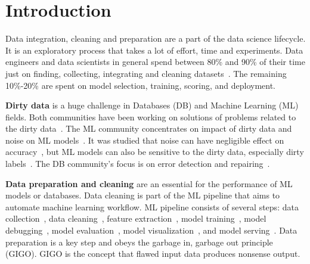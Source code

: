 \chapter{Introduction}
Data integration, cleaning and preparation are a part of the data science lifecycle. It is an exploratory process that takes a lot of effort, time and experiments.
Data engineers and data scientists in general spend between 80\% and 90\% of their time just on finding, collecting, integrating and cleaning datasets~\cite{80cleansurvey, dataintegration80}. The remaining 10\%-20\% are spent on model selection, training, scoring, and deployment.

\textbf{Dirty data} is a huge challenge in Databases (DB) and Machine Learning (ML) fields.
Both communities have been working on solutions of problems related to the dirty data~\cite{cleanml}. 
The ML community concentrates on impact of dirty data and noise on ML models~\cite{cleanml}.
It was studied that noise can have negligible effect on accuracy~\cite{processingsys, outperformstudy}, but ML models can also be sensitive to the dirty data, especially dirty labels~\cite{classificationnoisesurvey}.
The DB community's focus is on error detection and repairing~\cite{Hellerstein08quantitativedata, duplicatesstudy}.

\textbf{Data preparation and cleaning} are an essential for the performance of ML models or databases.
Data cleaning is part of the ML pipeline that aims to automate machine learning workflow. 
ML pipeline consists of several steps: data collection~\cite{LiDLMS2015}, data cleaning~\cite{raha, baran, RekatsinasCIR2017, holodetect, activeclean, alphaclean, cleanml}, feature extraction~\cite{ShahLKYK2021}, model training~\cite{RekatsinasCIR2017}, model debugging~\cite{SagadeevaB2021}, model evaluation~\cite{generalizing_confusion_matrix}, model visualization~\cite{NakandalaKP2019, CrottyGZBK2015, SimonyanVZ2013}, and model serving~\cite{OlstonFGHLLRR2017, Lee2018, WeiGZWCNOSR2018}.
Data preparation is a key step and obeys the garbage in, garbage out principle (GIGO).
GIGO is the concept that flawed input data produces nonsense output.

